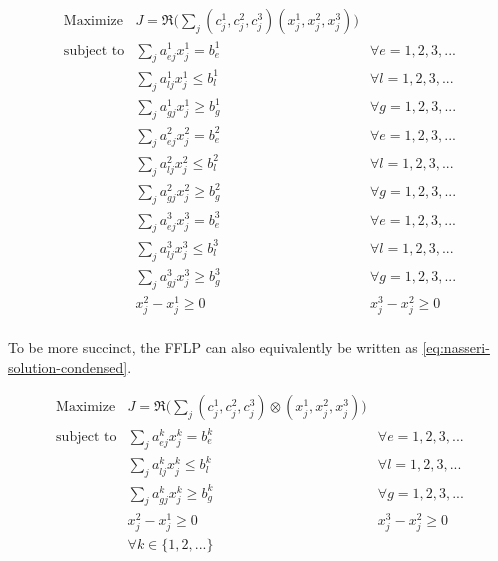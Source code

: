 \documentclass[11pt,a4paper,final]{article}
\begin{document}
\begin{equation}
\label{eq:nasseri-solution}
\begin{array}{lll}
\text{Maximize}   & J = \mathfrak{R}\Big(\sum_j (c_j^1,c_j^2,c_j^3)(x_j^1,x_j^2,x_j^3)\Big) &\\
\text{subject to} & \sum_j a_{ej}^1 x_j^1 = b_e^1 &  \forall e = 1,2,3,... \\
                  & \sum_j a_{lj}^1 x_j^1 \le b_l^1 &  \forall l = 1,2,3,... \\
                  & \sum_j a_{gj}^1 x_j^1 \ge b_g^1  &  \forall g = 1,2,3,... \\
                  & \sum_j a_{ej}^2 x_j^2 = b_e^2 &  \forall e = 1,2,3,... \\
                  & \sum_j a_{lj}^2 x_j^2 \le b_l^2 &  \forall l = 1,2,3,... \\
                  & \sum_j a_{gj}^2 x_j^2 \ge b_g^2  &  \forall g = 1,2,3,... \\
                  & \sum_j a_{ej}^3 x_j^3 = b_e^3 &  \forall e = 1,2,3,... \\
                  & \sum_j a_{lj}^3 x_j^3 \le b_l^3 &  \forall l = 1,2,3,... \\
                  & \sum_j a_{gj}^3 x_j^3 \ge b_g^3  &  \forall g = 1,2,3,... \\
                  & x_j^2 - x_j^1 \ge 0         & x_j^3 - x_j^2 \ge 0 \\
\end{array}
\end{equation}

\noindent
To be more succinct, the FFLP can also equivalently be written as \ref{eq:nasseri-solution-condensed}.

\begin{equation}
\label{eq:nasseri-solution-condensed}
\begin{array}{lll}
\text{Maximize}   & J = \mathfrak{R}\Big(\sum_j (c_j^1,c_j^2,c_j^3) \otimes (x_j^1,x_j^2,x_j^3)\Big) &\\
\text{subject to} & \sum_j a_{ej}^k x_j^k = b_e^k &  \forall e = 1,2,3,... \\
                  & \sum_j a_{lj}^k x_j^k \le b_l^k &  \forall l = 1,2,3,... \\
                  & \sum_j a_{gj}^k x_j^k \ge b_g^k  &  \forall g = 1,2,3,... \\
                  & x_j^2 - x_j^1 \ge 0         & x_j^3 - x_j^2 \ge 0 \\
                  & \forall k \in \{1,2,...\}        &                  \\
\end{array}
\end{equation}
\end{document}
